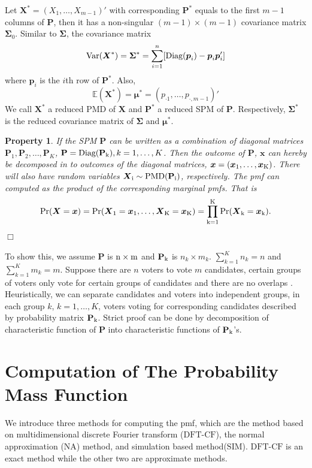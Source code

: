 \documentclass[12pt]{article}
\newcommand{\EE}{\mathbb{E}}
\newcommand{\Pmat}{\mathbf{P}}
\newcommand{\pvec}{\boldsymbol{p}}
\newcommand{\Var}{{\rm Var}}
\newcommand{\diag}{\textrm{Diag}}
\newcommand{\PMD}{\textrm{PMD}}
\newcommand{\Xvec}{\boldsymbol{X}}
\newcommand{\xvec}{\boldsymbol{x}}
\newcommand{\Sig}{\boldsymbol{\Sigma}}
\newcommand{\mvec}{\boldsymbol{\mu}}
\newcommand{\SIM}{{\textrm{SIM}}}
\newcommand{\NA}{{\textrm{NA}}}
\newcommand{\dft}{{\textrm{DFT-CF}}}
\newcommand{\qedw}{\hfill \ensuremath{\Box}}
\newtheorem{ppt}{Property}
\begin{document}
Let $\Xvec^{\ast}=(X_1,\dots,X_{m-1})'$ with corresponding $\Pmat^{\ast}$ equals to the first $m-1$ columns of $\Pmat$, then it has a non-singular $(m-1) \times (m-1)$ covariance matrix $\boldsymbol{\Sigma}_{0}$. Similar to $\Sig$, the covariance matrix
 $$\Var(\Xvec^{\ast}) =\Sig^{\ast}=\sum_{i=1}^n[\diag(\pvec_i)-\pvec_i\pvec_i']$$
where $\pvec_i$ is the $i$th row of $\Pmat^{\ast}$. Also,
  $$\EE(\Xvec^{\ast}) =\boldsymbol{\mu^{\ast}} = \left( p_{\cdot1} ,\dots,p_{\cdot,m-1}\right)'$$
 We call $\Xvec^{\ast}$ a reduced $\PMD$ of $\Xvec$ and $\Pmat^{\ast}$ a reduced SPM of $\Pmat$. Respectively, $\Sig^{\ast}$ is the reduced covariance matrix of $\Sig$ and $\mvec^{\ast}$.
\begin{ppt}\normalfont
If the SPM $\Pmat$ can be written as a combination of diagonal matrices $\Pmat_1, \Pmat_2, \dots, \Pmat_{K}$, $\Pmat = \diag(\Pmat_{\rm k}), k=1,\dots,K$. Then the outcome of $\Pmat$, $\boldsymbol{x}$ can hereby be decomposed in to outcomes of the diagonal matrices, $\xvec= (\xvec_{1},\dots,\xvec_{\rm K})$.  There will also have random variables $\Xvec_{\rm i} \sim \PMD(\Pmat_{\rm i})$, respectively. The pmf can computed as the product of the corresponding marginal pmfs. That is
\begin{align*}
\rm Pr(\Xvec=\xvec)= \rm \Pr(\Xvec_{1}=\xvec_{1}, \dots, \Xvec_{\rm K}=\xvec_{\rm K})= \prod_{k=1}^K \rm Pr(\Xvec_{k} = \xvec_{k}).
\end{align*}
\qedw
\end{ppt}

To show this, we assume $\Pmat$ is $\rm n \times m$ and $\Pmat_{\rm k}$ is $n_k \times m_k$. $\sum_{k=1}^K n_k = n$ and $\sum_{k=1}^K m_k = m$. Suppose there are $n$ voters to vote $m$ candidates, certain groups of voters only vote for certain groups of candidates and there are no overlaps . Heuristically, we can separate candidates and voters into independent groups, in each group $k$, $k = 1,\dots,K$, voters voting for corresponding candidates described by probability matrix $\Pmat_{\rm k}$. Strict proof can be done by decomposition of characteristic function of $\Pmat$ into characteristic functions of $\Pmat_{\rm k}$'s.



\section{Computation of The Probability Mass Function}\label{sec:CA.driving.study}
We introduce three methods for computing the pmf, which are the method based on multidimensional discrete Fourier transform ($\dft$), the normal approximation ($\NA$) method, and simulation based method($\SIM$). $\dft$ is an exact method while the other two are approximate methods.
\end{document}
